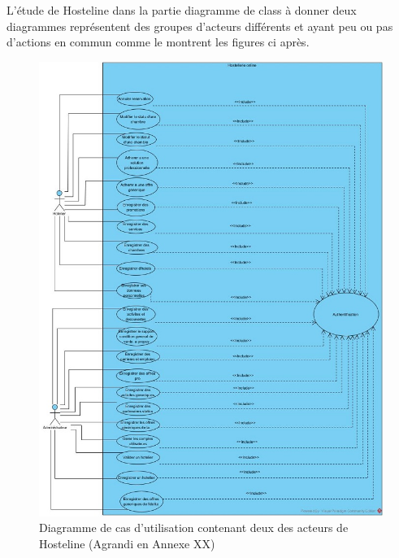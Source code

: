 \cleardoublepage

L’étude de Hosteline dans la partie diagramme de class à donner deux diagrammes représentent des groupes d’acteurs différents et ayant peu ou pas d’actions en commun comme le montrent les figures ci après.

\begin{figure}[!htbp]
	\begin{center}
		\includegraphics[scale=0.85]{images/diag_use_case2.jpg}
	\caption{Diagramme de cas d'utilisation contenant deux des acteurs de Hosteline (Agrandi en Annexe XX)}
		\label{use_case_diagramme_one}
	\end{center}
\end{figure}

